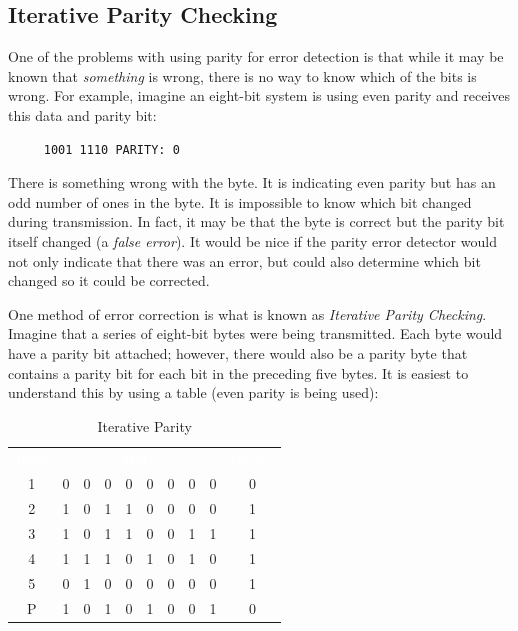 \subsection{Iterative Parity Checking}
\label{CL:subsec:iterative_parity_checking}

One of the problems with using parity for error detection is that while it may be known that \emph{something} is wrong, there is no way to know which of the bits is wrong. For example, imagine an eight-bit system is using even parity and receives this data and parity bit:

\begin{verbatim}
     1001 1110 PARITY: 0
\end{verbatim} 

There is something wrong with the byte. It is indicating even parity but has an odd number of ones in the byte. It is impossible to know which bit changed during transmission. In fact, it may be that the byte is correct but the parity bit itself changed (a \emph{false error}). It would be nice if the parity error detector would not only indicate that there was an error, but could also determine which bit changed so it could be corrected. 

One method of error correction is what is known as \emph{Iterative Parity Checking}. Imagine that a series of eight-bit bytes were being transmitted. Each byte would have a parity bit attached; however, there would also be a parity byte that contains a parity bit for each bit in the preceding five bytes. It is easiest to understand this by using a table (even parity is being used):

\begin{table}[H]
  \sffamily
  \newcommand{\head}[1]{\textcolor{white}{\textbf{#1}}}    
  \begin{center}
    \begin{tabular}{cccccccccc} 
      \rowcolor{black!75}
      \head{Byte} & \multicolumn{8}{c}{\head{Data}} & \head{Parity} \\
      1 & 0 & 0 & 0 & 0 & 0 & 0 & 0 & 0 & 0 \\
      2 & 1 & 0 & 1 & 1 & 0 & 0 & 0 & 0 & 1 \\
      3 & 1 & 0 & 1 & 1 & 0 & 0 & 1 & 1 & 1 \\
      4 & 1 & 1 & 1 & 0 & 1 & 0 & 1 & 0 & 1 \\
      5 & 0 & 1 & 0 & 0 & 0 & 0 & 0 & 0 & 1 \\
      P & 1 & 0 & 1 & 0 & 1 & 0 & 0 & 1 & 0
    \end{tabular}
  \end{center}
  \caption{Iterative Parity}
  \label{CL:tab:iterative_parity}
\end{table}
 
